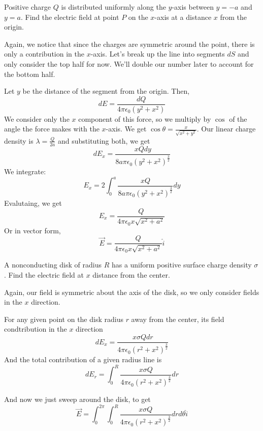 \documentclass{article}
\begin{document}
\begin{example}
Positive charge $Q$ is distributed uniformly along the $y$-axis between $y = -a$ and $y = a$. Find the electric field at point $P$ on the $x$-axis at a distance $x$ from the origin. 
\end{example}

\begin{solution}
Again, we notice that since the charges are symmetric around the point, there is only a contribution in the $x$-axis. Let's break up the line into segments $dS$ and only consider the top half for now. We'll double our number later to account for the bottom half. 

Let $y$ be the distance of the segment from the origin. Then, $$dE = \frac{dQ}{4\pi\epsilon_0(y^2 + x^2)}$$We consider only the $x$ component of this force, so we multiply by $\cos$ of the angle the force makes with the $x$-axis. We get $\cos\theta = \frac{x}{\sqrt{x^2 + y^2}}$. Our linear charge density is $\lambda = \frac{Q}{2a}$ and substituting both, we get $$dE_x = \frac{xQ dy}{8a\pi\epsilon_0(y^2 + x^2)^\frac{3}{2}}$$We integrate: $$E_x = 2\int_{0}^{a} \frac{xQ}{8a\pi\epsilon_0(y^2 + x^2)^\frac{3}{2}} dy$$Evalutaing, we get $$E_x = \frac{Q}{4\pi\epsilon_0x\sqrt{x^2+a^2}}$$Or in vector form, $$\vec{E} = \frac{Q}{4\pi\epsilon_0x\sqrt{x^2+a^2}} \hat{i}$$
\end{solution}

\begin{example}
A nonconducting disk of radius $R$ has a uniform positive surface charge density $\sigma$. Find the electric field at $x$ distance from the center. 
\end{example}

\begin{solution}
Again, our field is symmetric about the axis of the disk, so we only consider fields in the $x$ direction. 

For any given point on the disk radius $r$ away from the center, its field condtribution in the $x$ direction $$dE_x = \frac{x \sigma Q dr}{4\pi\epsilon_0(r^2 + x^2)^\frac{3}{2}}$$And the total contribution of a given radius line is $$dE_r = \int_{0}^{R} \frac{x \sigma Q}{4\pi\epsilon_0(r^2+x^2)^\frac{3}{2}} dr$$

And now we just sweep around the disk, to get $$\vec{E} = \int_{0}^{2\pi} \int_{0}^{R}\frac{x\sigma Q}{4\pi\epsilon_0(r^2 + x^2)^\frac{3}{2}}drd\theta \hat{i}$$
\end{solution}
\end{document}
